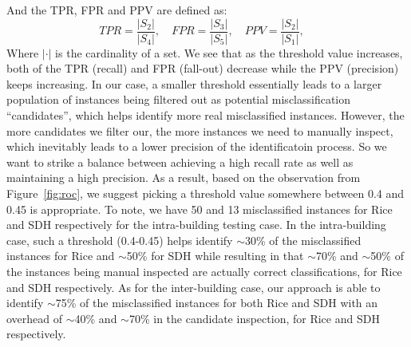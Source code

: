 And the TPR, FPR and PPV are defined as: 
\begin{displaymath}
TPR = \frac{|S_{2}|}{|S_{4}|},\quad
FPR = \frac{|S_{3}|}{|S_{5}|},\quad
PPV = \frac{|S_{2}|}{|S_{1}|},\quad
\end{displaymath}
Where $|\cdot|$ is the cardinality of a set. We see that as the threshold value increases, both of the TPR (recall) and FPR (fall-out) decrease while the PPV (precision) keeps increasing. 
In our case, a smaller threshold essentially leads to a larger population of instances being filtered out as potential misclassification ``candidates'', which helps identify more real 
misclassified instances. However, the more candidates we filter our, the more instances we need to manually inspect, which inevitably leads to a lower precision of the identificatoin process. 
So we want to strike a balance between achieving a high recall rate as well as maintaining a high precision. As a result, based on the observation from Figure~\ref{fig:roc}, we suggest 
picking a threshold value somewhere between 0.4 and 0.45 is appropriate. To note, we have 50 and 13 misclassified instances for Rice and SDH respectively for the intra-building testing case. 
In the intra-building case, such a threshold (0.4-0.45) helps identify $\sim$30\% of the misclassified instances for Rice and $\sim$50\% for SDH while resulting in that $\sim$70\% and $\sim$50\% 
of the instances being manual inspected are actually correct classifications, for Rice and SDH respectively. As for the inter-building case, our approach is able to identify $\sim$75\% of the 
misclassified instances for both Rice and SDH with an overhead of $\sim$40\% and $\sim$70\% in the candidate inspection, for Rice and SDH respectively.

